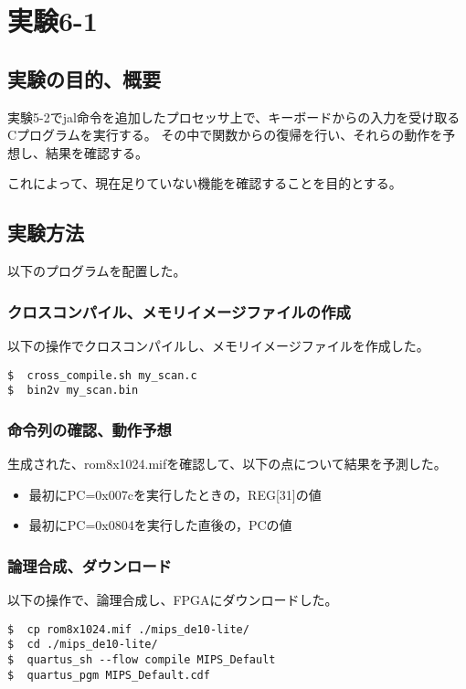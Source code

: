 \section{実験6-1}
\subsection{実験の目的、概要}
実験5-2でjal命令を追加したプロセッサ上で、キーボードからの入力を受け取るCプログラムを実行する。
その中で関数からの復帰を行い、それらの動作を予想し、結果を確認する。

これによって、現在足りていない機能を確認することを目的とする。

\subsection{実験方法}
以下のプログラムを配置した。


\subsubsection{クロスコンパイル、メモリイメージファイルの作成}
以下の操作でクロスコンパイルし、メモリイメージファイルを作成した。
\begin{lstlisting}[caption={クロスコンパイル、メモリイメージファイルの作成},label={クロスコンパイル、メモリイメージファイルの作成5-1}]
$  cross_compile.sh my_scan.c
$  bin2v my_scan.bin
\end{lstlisting}

\subsubsection{命令列の確認、動作予想}
生成された、rom8x1024.mifを確認して、以下の点について結果を予測した。
\begin{itemize}
  \item 最初にPC=0x007cを実行したときの，REG[31]の値
  \item 最初にPC=0x0804を実行した直後の，PCの値
\end{itemize}

\subsubsection{論理合成、ダウンロード}
以下の操作で、論理合成し、FPGAにダウンロードした。
\begin{lstlisting}[caption={論理合成、ダウンロード},label={論理合成、ダウンロード6-1}]
$  cp rom8x1024.mif ./mips_de10-lite/
$  cd ./mips_de10-lite/
$  quartus_sh --flow compile MIPS_Default
$  quartus_pgm MIPS_Default.cdf
\end{lstlisting}


